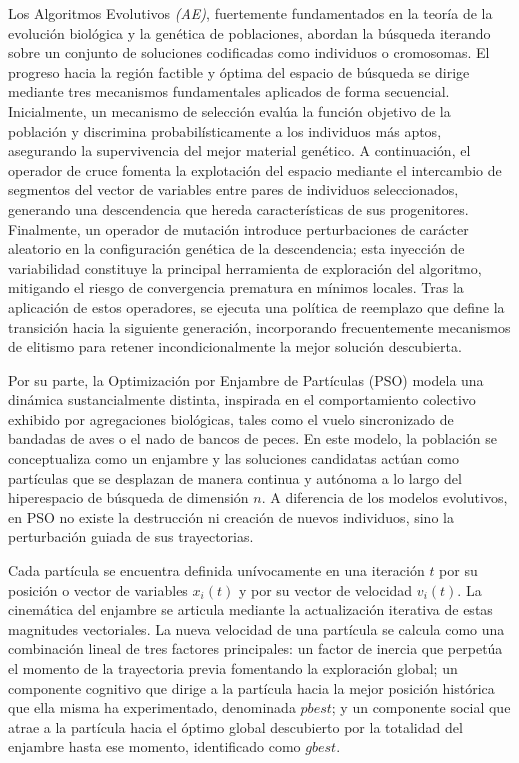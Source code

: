 \documentclass[12pt,a4paper,twoside,openright]{book}
\begin{document}
    Los Algoritmos Evolutivos \textit{(AE)}, fuertemente fundamentados en la teoría de la evolución biológica y la genética de poblaciones, abordan la búsqueda iterando sobre un conjunto de soluciones codificadas como individuos o cromosomas. El progreso hacia la región factible y óptima del espacio de búsqueda se dirige mediante tres mecanismos fundamentales aplicados de forma secuencial. Inicialmente, un mecanismo de selección evalúa la función objetivo de la población y discrimina probabilísticamente a los individuos más aptos, asegurando la supervivencia del mejor material genético. A continuación, el operador de cruce fomenta la explotación del espacio mediante el intercambio de segmentos del vector de variables entre pares de individuos seleccionados, generando una descendencia que hereda características de sus progenitores. Finalmente, un operador de mutación introduce perturbaciones de carácter aleatorio en la configuración genética de la descendencia; esta inyección de variabilidad constituye la principal herramienta de exploración del algoritmo, mitigando el riesgo de convergencia prematura en mínimos locales. Tras la aplicación de estos operadores, se ejecuta una política de reemplazo que define la transición hacia la siguiente generación, incorporando frecuentemente mecanismos de elitismo para retener incondicionalmente la mejor solución descubierta.

    Por su parte, la Optimización por Enjambre de Partículas (PSO) modela una dinámica sustancialmente distinta, inspirada en el comportamiento colectivo exhibido por agregaciones biológicas, tales como el vuelo sincronizado de bandadas de aves o el nado de bancos de peces. En este modelo, la población se conceptualiza como un enjambre y las soluciones candidatas actúan como partículas que se desplazan de manera continua y autónoma a lo largo del hiperespacio de búsqueda de dimensión $n$. A diferencia de los modelos evolutivos, en PSO no existe la destrucción ni creación de nuevos individuos, sino la perturbación guiada de sus trayectorias. 

    Cada partícula se encuentra definida unívocamente en una iteración $t$ por su posición o vector de variables $x_i(t)$ y por su vector de velocidad $v_i(t)$. La cinemática del enjambre se articula mediante la actualización iterativa de estas magnitudes vectoriales. La nueva velocidad de una partícula se calcula como una combinación lineal de tres factores principales: un factor de inercia que perpetúa el momento de la trayectoria previa fomentando la exploración global; un componente cognitivo que dirige a la partícula hacia la mejor posición histórica que ella misma ha experimentado, denominada $pbest$; y un componente social que atrae a la partícula hacia el óptimo global descubierto por la totalidad del enjambre hasta ese momento, identificado como $gbest$. 
\end{document}
